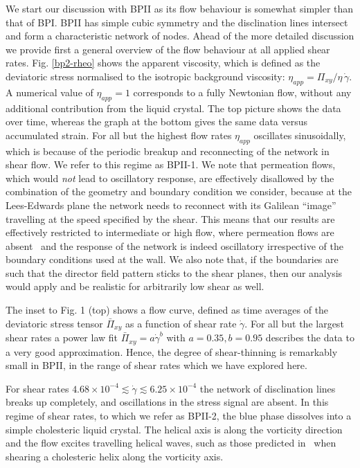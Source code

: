 \documentclass[aps,pre,reprint,superscriptaddress, twocolumn]{revtex4}
\newcommand{\e}[1]{\times10^{#1}}
\newcommand{\gd}{\dot{\gamma}}
\begin{document}
We start our discussion with BPII as its flow behaviour is somewhat simpler 
than that of BPI. BPII has simple cubic symmetry and the disclination lines 
intersect and form a characteristic network of nodes.
Ahead of the more detailed discussion we provide first a general overview of the 
flow behaviour at all applied shear rates.
Fig. \ref{bp2-rheo} shows the apparent viscosity, which is defined as the 
deviatoric stress normalised to the isotropic background viscosity: 
$\eta_{app}=\Pi_{xy}/\eta\,\gd$.
A numerical value of $\eta_{app}=1$ corresponds to a fully Newtonian flow,
without any additional contribution from the liquid crystal.
The top picture shows the data over time, whereas the graph at the bottom gives 
the same data versus accumulated strain.
For all but the highest flow rates $\eta_{app}$ oscillates sinusoidally, which
is because of the periodic breakup and reconnecting of the network in shear flow. 
We refer to this regime as BPII-1. We note that permeation flows, which would
{\em not} lead to oscillatory response, are effectively disallowed by the combination
of the geometry and boundary condition we consider, because at the Lees-Edwards 
plane the network needs to reconnect with its Galilean ``image'' travelling
at the speed specified by the shear. This means that  our results are effectively
restricted to intermediate or high flow, where permeation flows are 
absent~\cite{Marenduzzo:2006a,Marenduzzo:2006b} and the response of the network
is indeed oscillatory irrespective of the boundary conditions used at the wall. 
We also note that, if the boundaries are such that
the director field pattern sticks to the shear planes, then our analysis
would apply and be realistic for arbitrarily low shear as well.

The inset to Fig. 1 (top) shows a flow curve, defined as time averages of 
the deviatoric stress tensor $\bar{\Pi}_{xy}$ as a function of shear rate $\gd$.
For all but the largest shear rates a power law fit $\bar{\Pi}_{xy}=a \gd^b$ with 
$a=0.35, b=0.95$ describes the data to a very good approximation. 
Hence, the degree of shear-thinning is remarkably small in BPII, in
the range of shear rates which we have explored here.

For shear rates $4.68\e{-4}\lesssim\gd\lesssim6.25\e{-4}$ the network of disclination lines
breaks up completely, and oscillations in the stress signal are absent.
In this regime of shear rates, to which we refer as BPII-2, the 
blue phase dissolves into a simple cholesteric liquid 
crystal. The helical axis is along the vorticity direction and
the flow excites travelling helical waves, such as those 
predicted in~\cite{Rey:1996a,Rey:1996b} when shearing a cholesteric helix along
the vorticity axis.
\end{document}
